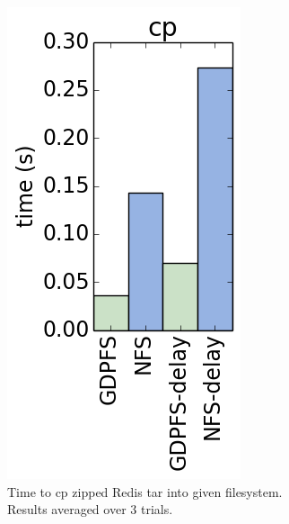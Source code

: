 \documentclass{acm_proc_article-sp}
\begin{document}
\begin{figure}[t]
\begin{subfigure}[b]{0.2\textwidth}
    \centering
    \includegraphics[width=.8\columnwidth]{cp.png}
    \caption{Time to cp zipped Redis tar into given filesystem. Results averaged over 3 trials.\label{fig:cp}}
  \end{subfigure}
  ~
  \begin{subfigure}[b]{0.2\textwidth}
    \centering

\end{subfigure}
\end{figure}
\end{document}

